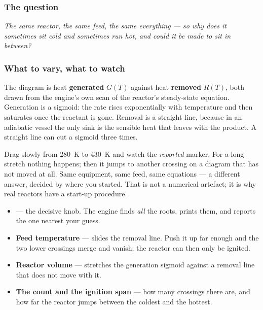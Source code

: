 \documentclass[11pt,a4paper]{article}
\begin{document}

\subsubsection*{The question}

\emph{The same reactor, the same feed, the same everything --- so why does
it sometimes sit cold and sometimes run hot, and could it be made to sit
in between?}

\subsubsection*{What to vary, what to watch}

The diagram is heat \textbf{generated} $G(T)$ against heat
\textbf{removed} $R(T)$, both drawn from the engine's own scan of the
reactor's steady-state equation.  Generation is a sigmoid: the rate rises
exponentially with temperature and then saturates once the reactant is
gone.  Removal is a straight line, because in an adiabatic vessel the only
sink is the sensible heat that leaves with the product.  A straight line
can cut a sigmoid three times.

\begin{tryit}
Drag  slowly from $280$~K to $430$~K and watch the
\emph{reported} marker.  For a long stretch nothing happens; then it jumps
to another crossing on a diagram that has not moved at all.  Same
equipment, same feed, same equations --- a different answer, decided by
where you started.  That is not a numerical artefact; it is why real
reactors have a start-up procedure.
\end{tryit}

\begin{itemize}[leftmargin=*,nosep]
  \item \textbf{} --- the decisive knob.  The engine finds
        \emph{all} the roots, prints them, and reports the one nearest
        your guess.
  \item \textbf{Feed temperature} --- slides the removal line.  Push it up
        far enough and the two lower crossings merge and vanish; the
        reactor can then only be ignited.
  \item \textbf{Reactor volume} --- stretches the generation sigmoid
        against a removal line that does not move with it.
  \item \textbf{The  count and the ignition span} ---
        how many crossings there are, and how far the reactor jumps
        between the coldest and the hottest.
\end{itemize}
\end{document}
